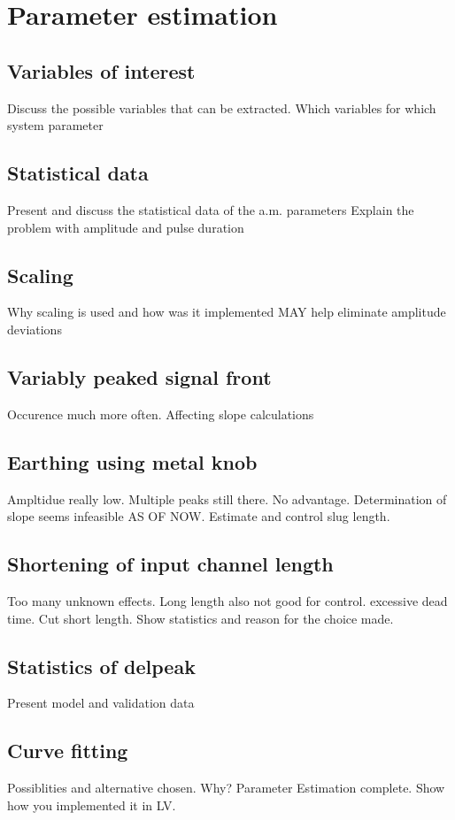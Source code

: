 \documentclass[main.tex]{subfiles}
\begin{document}
%
\chapter[Parameter estimation]{Parameter estimation}
%
\section[Variables of interest]{Variables of interest}
Discuss the possible variables that can be extracted.
Which variables for which system parameter
%
\section[Statistical data]{Statistical data}
Present and discuss the statistical data of the a.m. parameters
Explain the problem with amplitude and pulse duration
%
\section[Scaling]{Scaling}
Why scaling is used and how was it implemented
MAY help eliminate amplitude deviations
%
\section[Variably peaked signal front]{Variably peaked signal front}
Occurence much more often. 
Affecting slope calculations
%
\section[Earthing using metal knob]{Earthing using metal knob}
Ampltidue really low.
Multiple peaks still there.
No advantage. 
Determination of slope seems infeasible AS OF NOW.
Estimate and control slug length.
%
\section[Shortening of input channel length]{Shortening of input channel length}
Too many unknown effects.
Long length also not good for control. excessive dead time.
Cut short length.
Show statistics and reason for the choice made.
%
\section[Statistics of delpeak]{Statistics of delpeak}
Present model and validation data
%
\section[Curve fitting]{Curve fitting}
Possiblities and alternative chosen. Why?
Parameter Estimation complete.
Show how you implemented it in LV.
\end{document}
